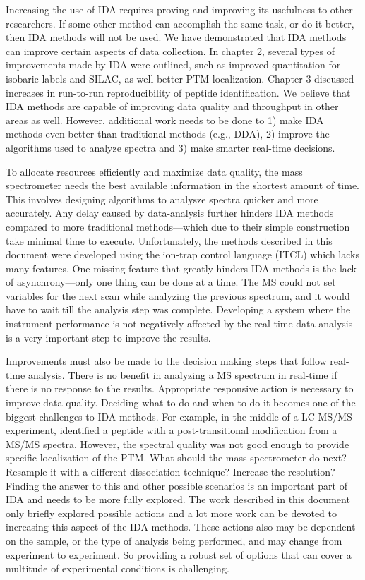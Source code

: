 Increasing the use of IDA requires proving and improving its usefulness to other researchers. If some other method can accomplish the same task, or do it better, then IDA methods will not be used. We have demonstrated that IDA methods can improve certain aspects of data collection. In chapter 2, several types of improvements made by IDA were outlined, such as improved quantitation for isobaric labels and SILAC, as well better PTM localization. Chapter 3 discussed increases in run-to-run reproducibility of peptide identification. We believe that IDA methods are capable of improving data quality and throughput in other areas as well. However, additional work needs to be done to 1) make IDA methods even better than traditional methods (e.g., DDA), 2) improve the algorithms used to analyze spectra and 3) make smarter real-time decisions.

To allocate resources efficiently and maximize data quality, the mass spectrometer needs the best available information in the shortest amount of time. This involves designing algorithms to analysze spectra quicker and more accurately. Any delay caused by data-analysis further hinders IDA methods compared to more traditional methods---which due to their simple construction take minimal time to execute. Unfortunately, the methods described in this document were developed using the ion-trap control language (ITCL) which lacks many features. One missing feature that greatly hinders IDA methods is the lack of asynchrony---only one thing can be done at a time. The MS could not set variables for the next scan while analyzing the previous spectrum, and it would have to wait till the analysis step was complete. Developing a system where the instrument performance is not negatively affected by the real-time data analysis is a very important step to improve the results. 

Improvements must also be made to the decision making steps that follow real-time analysis. There is no benefit in analyzing a MS spectrum in real-time if there is no response to the results. Appropriate responsive action is necessary to improve data quality. Deciding what to do and when to do it becomes one of the biggest challenges to IDA methods. For example, in the middle of a LC-MS/MS experiment, \inseq{} identified a peptide with a post-transitional modification from a MS/MS spectra. However, the spectral quality was not good enough to provide specific localization of the PTM. What should the mass spectrometer do next? Resample it with a different dissociation technique? Increase the resolution? Finding the answer to this and other possible scenarios is an important part of IDA and needs to be more fully explored. The work described in this document only briefly explored possible actions and a lot more work can be devoted to increasing this aspect of the IDA methods. These actions also may be dependent on the sample, or the type of analysis being performed, and may change from experiment to experiment. So providing a robust set of options that can cover a multitude of experimental conditions is challenging.

